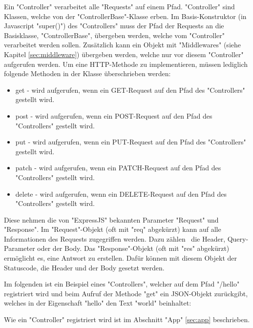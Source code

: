 \label{sec:controller}

Ein "Controller" verarbeitet alle "Requests" auf einem Pfad. 
"Controller" sind Klassen, welche von der "ControllerBase"-Klasse erben. 
Im Basis-Konstruktor (in Javascript "{\ttfamily super()}") des "Controllers" muss der Pfad der Requests an die Basisklasse, "ControllerBase", übergeben werden, welche vom "Controller" verarbeitet werden sollen. 
Zusätzlich kann ein Objekt mit "Middlewares" (siehe Kapitel \ref{sec:middleware}) übergeben werden, welche nur vor diesem "Controller" aufgerufen werden. 
Um eine HTTP-Methode zu implementieren, müssen lediglich folgende Methoden in der Klasse überschrieben werden:

\begin{itemize}
    \item {\ttfamily get} - wird aufgerufen, wenn ein GET-Request auf den Pfad des "Controllers" gestellt wird.
    \item {\ttfamily post} - wird aufgerufen, wenn ein POST-Request auf den Pfad des "Controllers" gestellt wird.
    \item {\ttfamily put} - wird aufgerufen, wenn ein PUT-Request auf den Pfad des "Controllers" gestellt wird.
    \item {\ttfamily patch} - wird aufgerufen, wenn ein PATCH-Request auf den Pfad des "Controllers" gestellt wird.
    \item {\ttfamily delete} - wird aufgerufen, wenn ein DELETE-Request auf den Pfad des "Controllers" gestellt wird.
\end{itemize}

Diese nehmen die von "ExpressJS" bekannten Parameter "Request" und "Response". 
Im "Request"-Objekt (oft mit "req" abgekürzt) kann auf alle Informationen des Requests zugegriffen werden. Dazu zählen \zb\ die Header, Query-Parameter oder der Body.
Das "Response"-Objekt (oft mit "res" abgekürzt) ermöglicht es, eine Antwort zu erstellen. Dafür können mit diesem Objekt der Statuscode, die Header und der Body gesetzt werden.

Im folgenden ist ein Beispiel eines "Controllers", welcher auf dem Pfad "/hello" registriert wird und beim Aufruf der Methode "get" ein JSON-Objekt zurückgibt, welches in der Eigenschaft "hello" den Text "world" beinhaltet:


Wie ein "Controller" registriert wird ist im Abschnitt "App" \ref{sec:app} beschrieben. 